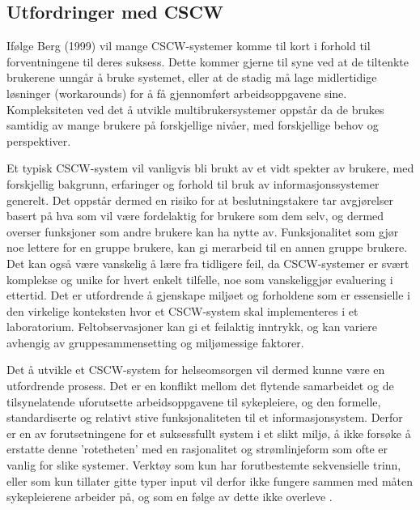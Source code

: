 \subsection{Utfordringer med CSCW}
\label{chp: utfordringerMedCSCW}

Ifølge Berg (1999) vil mange CSCW-systemer komme til kort i forhold til forventningene til deres suksess. Dette kommer gjerne til syne ved at de tiltenkte brukerene unngår å bruke systemet, eller at de stadig må lage midlertidige løsninger (workarounds) for å få gjennomført arbeidsoppgavene sine. 
Kompleksiteten ved det å utvikle multibrukersystemer oppstår da de brukes samtidig av mange brukere på forskjellige nivåer, med forskjellige behov og perspektiver.

\noindent 
Et typisk CSCW-system vil vanligvis bli brukt av et vidt spekter av brukere, med forskjellig bakgrunn, erfaringer og forhold til bruk av informasjonssystemer generelt. Det oppstår dermed en risiko for at beslutningstakere tar avgjørelser basert på hva som vil være fordelaktig for brukere som dem selv, og dermed overser funksjoner som andre brukere kan ha nytte av. Funksjonalitet som gjør noe lettere for en gruppe brukere, kan gi merarbeid til en annen gruppe brukere. 
\noindent
Det kan også være vanskelig å lære fra tidligere feil, da CSCW-systemer er svært komplekse og unike for hvert enkelt tilfelle, noe som vanskeliggjør evaluering i ettertid. Det er utfordrende å gjenskape miljøet og forholdene som er essensielle i den virkelige konteksten hvor et CSCW-system skal implementeres i et laboratorium. Feltobservasjoner kan gi et feilaktig inntrykk, og kan variere avhengig av gruppesammensetting og miljømessige faktorer.

\noindent
Det å utvikle et CSCW-system for helseomsorgen vil dermed kunne være en utfordrende prosess. Det er en konflikt mellom det flytende samarbeidet og de tilsynelatende uforutsette arbeidsoppgavene til sykepleiere, og den formelle, standardiserte og relativt stive funksjonaliteten til et informasjonsystem. Derfor er en av forutsetningene for et suksessfullt system i et slikt miljø, å ikke forsøke å erstatte denne 'rotetheten' med en rasjonalitet og strømlinjeform som ofte er vanlig for slike systemer. Verktøy som kun har forutbestemte sekvensielle trinn, eller som kun tillater gitte typer input vil derfor ikke fungere sammen med måten sykepleierene arbeider på, og som en følge av dette ikke overleve \cite{Berg99}.